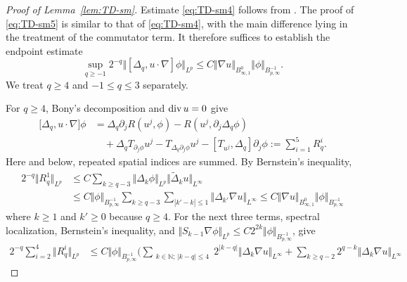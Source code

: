 \documentclass[reqno,11pt,a4paper]{amsart}
\renewcommand{\div}{{\rm div\,}}
\begin{document}
\begin{proof}[Proof of Lemma~\ref{lem:TD-sm}]
Estimate \eqref{eq:TD-sm4} follows from
\cite[Lemma~2.9]{LXY25}.
The proof of \eqref{eq:TD-sm5} is similar to that of
\eqref{eq:TD-sm4}, with the main difference lying
in the treatment of the commutator term.
It therefore suffices to establish the endpoint estimate
\begin{equation}\label{eq:comm-es-end}
  \sup_{q\geq-1}
  2^{-q}\Vert [\Delta_q,u\cdot\nabla]\phi\Vert _{L^p}
  \leq
  C\Vert \nabla u\Vert _{B^0_{\infty,1}}
  \Vert \phi\Vert _{B^{-1}_{p,\infty}}.
\end{equation}
We treat $q\geq4$ and $-1\leq q\leq3$ separately.

For $q\geq4$, Bony's decomposition and $\div u=0$ give
\begin{equation}\label{eq:comm-decomp-u-phi}
\begin{aligned}
  \bigl[\Delta_q,u\cdot\nabla\bigr]\phi
  &=
  \Delta_q\partial_jR(u^j,\phi)
  -R(u^j,\partial_j\Delta_q\phi)
  \\
  &\quad+
  \Delta_qT_{\partial_j\phi}u^j
  -T_{\Delta_q\partial_j\phi}u^j
  -[T_{u^j},\Delta_q]\partial_j\phi
  :=\sum_{i=1}^5R_q^i.
\end{aligned}
\end{equation}
Here and below, repeated spatial indices are summed.
By Bernstein's inequality,
\begin{equation}\label{eq:R1-u-phi}
\begin{aligned}
  2^{-q}\Vert R_q^1\Vert _{L^p}
  &\leq
  C\sum_{k\geq q-3}
  \Vert \Delta_k\phi\Vert _{L^p}
  \Vert \widetilde\Delta_ku\Vert _{L^\infty}
  \\
  &\leq
  C\Vert \phi\Vert _{B^{-1}_{p,\infty}}
  \sum_{k\geq q-3}
  \sum_{|k'-k|\leq1}
  \Vert \Delta_{k'}\nabla u\Vert _{L^\infty}
  \leq
  C\Vert \nabla u\Vert _{B^0_{\infty,1}}
  \Vert \phi\Vert _{B^{-1}_{p,\infty}}
\end{aligned}
\end{equation}
where $k\geq1$ and $k'\geq0$ because $q\geq4$.
For the next three terms, spectral localization, Bernstein's inequality, 
and $\Vert S_{k-1} \nabla \phi\Vert _{L^p} \leq C 2^{2k} \Vert \phi\Vert _{B^{-1}_{p,\infty}}$, give
\begin{align*}
  2^{-q}\sum_{i=2}^4\Vert R_q^i\Vert _{L^p}
  &\leq C\Vert \phi\Vert _{B^{-1}_{p,\infty}}
  \bigg(
    \sum_{\substack{k\in\mathbb{N};\,|k-q|\leq4}}
      2^{|k-q|}\Vert \Delta_k\nabla u\Vert _{L^\infty}
    +\sum_{k\geq q-2}
      2^{q-k}\Vert \Delta_k\nabla u\Vert _{L^\infty}

\end{align*}
\end{proof}
\end{document}
